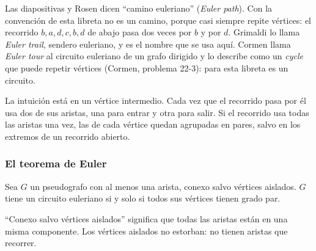 \documentclass[11pt,letterpaper]{article}
\begin{document}
\begin{ojo}
  Las diapositivas y Rosen dicen ``camino euleriano'' (\textit{Euler
  path}). Con la convención de esta libreta no es un camino, porque casi
  siempre repite vértices: el recorrido $b, a, d, c, b, d$ de abajo
  pasa dos veces por $b$ y por $d$. Grimaldi lo llama \textit{Euler
  trail}, sendero euleriano, y es el nombre que se usa aquí. Cormen
  llama \textit{Euler tour} al circuito euleriano de un grafo dirigido
  y lo describe como un \textit{cycle} que puede repetir vértices
  (Cormen, problema 22-3): para esta libreta es un circuito.
\end{ojo}

La intuición está en un vértice intermedio. Cada vez que el recorrido
pasa por él usa dos de sus aristas, una para entrar y otra para salir.
Si el recorrido usa todas las aristas una vez, las de cada vértice
quedan agrupadas en pares, salvo en los extremos de un recorrido
abierto.

\subsubsection*{El teorema de Euler}

\begin{teorema}[Euler]
  \label{teo:euler-circuito}
  Sea $G$ un pseudografo con al menos una arista, conexo salvo vértices
  aislados. $G$ tiene un circuito euleriano si y solo si todos sus
  vértices tienen grado par.
\end{teorema}

``Conexo salvo vértices aislados'' significa que todas las aristas
están en una misma componente. Los vértices aislados no estorban: no
tienen aristas que recorrer.
\end{document}
